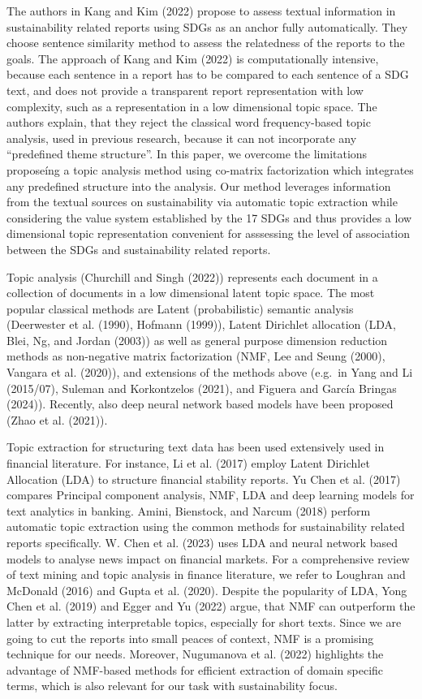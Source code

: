 \documentclass[
]{article}
\begin{document}
The authors in Kang and Kim (2022) propose to assess textual information in sustainability related reports using SDGs as an anchor fully automatically. They choose sentence similarity method to assess the relatedness of the reports to the goals. The approach of Kang and Kim (2022) is computationally intensive, because each sentence in a report has to be compared to each sentence of a SDG text, and does not provide a transparent report representation with low complexity, such as a representation in a low dimensional topic space. The authors explain, that they reject the classical word frequency-based topic analysis, used in previous research, because it can not incorporate any ``predefined theme structure''. In this paper, we overcome the limitations proposeíng a topic analysis method using co-matrix factorization which integrates any predefined structure into the analysis. Our method leverages information from the textual sources on sustainability via automatic topic extraction while considering the value system established by the 17 SDGs and thus provides a low dimensional topic representation convenient for asssessing the level of association between the SDGs and sustainability related reports.

Topic analysis (Churchill and Singh (2022)) represents each document in a collection of documents in a low dimensional latent topic space. The most popular classical methods are Latent (probabilistic) semantic analysis (Deerwester et al. (1990), Hofmann (1999)), Latent Dirichlet allocation (LDA, Blei, Ng, and Jordan (2003)) as well as general purpose dimension reduction methods as non-negative matrix factorization (NMF, Lee and Seung (2000), Vangara et al. (2020)), and extensions of the methods above (e.g.~in Yang and Li (2015/07), Suleman and Korkontzelos (2021), and Figuera and García Bringas (2024)). Recently, also deep neural network based models have been proposed (Zhao et al. (2021)).

Topic extraction for structuring text data has been used extensively used in financial literature. For instance, Li et al. (2017) employ Latent Dirichlet Allocation (LDA) to structure financial stability reports. Yu Chen et al. (2017) compares Principal component analysis, NMF, LDA and deep learning models for text analytics in banking. Amini, Bienstock, and Narcum (2018) perform automatic topic extraction using the common methods for sustainability related reports specifically. W. Chen et al. (2023) uses LDA and neural network based models to analyse news impact on financial markets. For a comprehensive review of text mining and topic analysis in finance literature, we refer to Loughran and McDonald (2016) and Gupta et al. (2020). Despite the popularity of LDA, Yong Chen et al. (2019) and Egger and Yu (2022) argue, that NMF can outperform the latter by extracting interpretable topics, especially for short texts. Since we are going to cut the reports into small peaces of context, NMF is a promising technique for our needs. Moreover, Nugumanova et al. (2022) highlights the advantage of NMF-based methods for efficient extraction of domain specific terms, which is also relevant for our task with sustainability focus.
\end{document}
